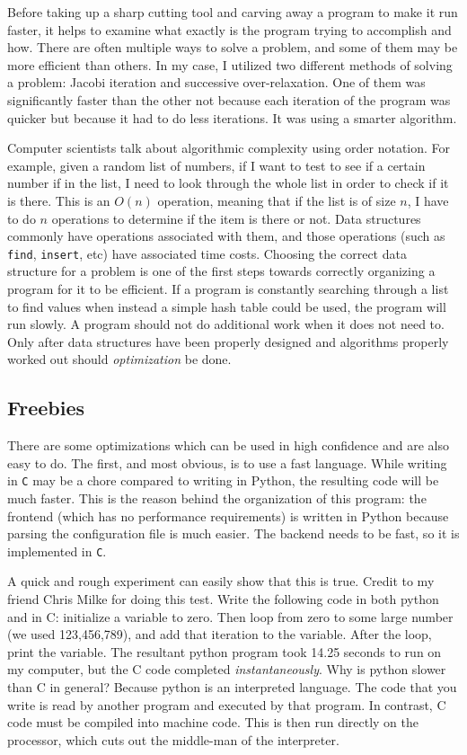 Before taking up a sharp cutting tool and carving away a program to make it run faster, it helps to examine
what exactly is the program trying to accomplish and how. There are often multiple ways to solve a problem,
and some of them may be more efficient than others. In my case, I utilized two different methods of solving
a problem: Jacobi iteration and successive over-relaxation. One of them was significantly faster than the other
not because each iteration of the program was quicker but because it had to do less iterations. It was using a
smarter algorithm.

Computer scientists talk about algorithmic complexity using order notation. For example, given a random list
of numbers, if I want to test to see if a certain number if in the list, I need to look through the whole
list in order to check if it is there. This is an $O(n)$ operation, meaning that if the list is of size $n$, I
have to do $n$ operations to determine if the item is there or not. Data structures commonly have operations
associated with them, and those operations (such as \texttt{find}, \texttt{insert}, etc) have associated
time costs. Choosing the correct data structure for a problem is one of the first steps towards correctly
organizing a program for it to be efficient. If a program is constantly searching through a list to find
values when instead a simple hash table could be used, the program will run slowly. A program should not
do additional work when it does not need to. Only after data structures have been properly designed
and algorithms properly worked out should \textit{optimization} be done.

\subsection{Freebies}

There are some optimizations which can be used in high confidence and are also easy to do.
The first, and most obvious, is to use a fast language. While writing in \texttt{C} may be a chore
compared to writing in Python, the resulting code will be much faster. This is the reason behind the
organization of this program: the frontend (which has no performance requirements) is written in
Python because parsing the configuration file is much easier. The backend needs to be fast, so it
is implemented in \texttt{C}.

A quick and rough experiment can easily show that this is true. Credit to my friend Chris Milke for doing this test. Write the following
code in both python and in C: initialize a variable to zero. Then loop from zero to some large
number (we used 123,456,789), and add that iteration to the variable. After the loop, print the
variable. The resultant python program took 14.25 seconds to run on my computer, but the C code
completed \textit{instantaneously}. Why is python slower than C in general? Because python is
an interpreted language. The code that you write is read by another program and executed by
that program. In contrast, C code must be compiled into machine code. This is then run directly
on the processor, which cuts out the middle-man of the interpreter.


